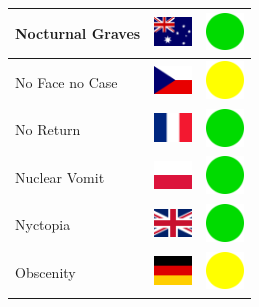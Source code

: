 \documentclass[12pt, a4paper, twoside]{report}
\begin{document}
\begin{center}
\begin{longtable}{|p{5cm}|p{2cm}|p{2cm}|}
Nocturnal Graves & \includegraphics[width=1cm]{4x3/au} & \includegraphics[width=1cm]{likes/y} \\ \hline
No Face no Case & \includegraphics[width=1cm]{4x3/cz} & \includegraphics[width=1cm]{likes/m} \\ \hline
No Return & \includegraphics[width=1cm]{4x3/fr} & \includegraphics[width=1cm]{likes/y} \\ \hline
Nuclear Vomit & \includegraphics[width=1cm]{4x3/pl} & \includegraphics[width=1cm]{likes/y} \\ \hline
Nyctopia & \includegraphics[width=1cm]{4x3/gb} & \includegraphics[width=1cm]{likes/y} \\ \hline
Obscenity & \includegraphics[width=1cm]{4x3/de} & \includegraphics[width=1cm]{likes/m} \\ \hline

\end{longtable}
\end{center}
\end{document}
